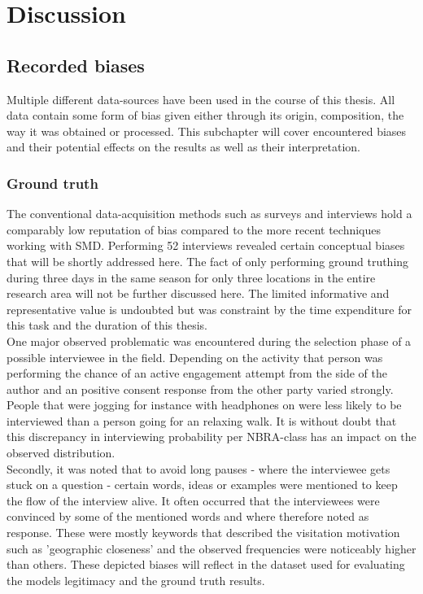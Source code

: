\chapter{Discussion} \label{discussion}

\section{Recorded biases}
Multiple different data-sources have been used in the course of this thesis. All data contain some form of bias given either through its origin, composition, the way it was obtained or processed. 
This subchapter will cover encountered biases and their potential effects on the results as well as their interpretation.

\subsection*{Ground truth}
The conventional data-acquisition methods such as surveys and interviews hold a comparably low reputation of bias compared to the more recent techniques working with SMD. Performing 52 interviews revealed certain conceptual biases that will be shortly addressed here. The fact of only performing ground truthing during three days in the same season for only three locations in the entire research area will not be further discussed here. The limited informative and representative value is undoubted but was constraint by the time expenditure for this task and the duration of this thesis. \\
\newline
One major observed problematic was encountered during the selection phase of a possible interviewee in the field. Depending on the activity that person was performing the chance of an active engagement attempt from the side of the author and an positive consent response from the other party varied strongly. People that were jogging for instance with headphones on were less likely to be interviewed than a person going for an relaxing walk. It is without doubt that this discrepancy in interviewing probability per NBRA-class has an impact on the observed distribution.\\
Secondly, it was noted that to avoid long pauses - where the interviewee gets stuck on a question - certain words, ideas or examples were mentioned to keep the flow of the interview alive. It often occurred that the interviewees were convinced by some of the mentioned words and where therefore noted as response. These were mostly keywords that described the visitation motivation such as 'geographic closeness' and the observed frequencies were noticeably higher than others. These depicted biases will reflect in the dataset used for evaluating the models legitimacy and the ground truth results.

